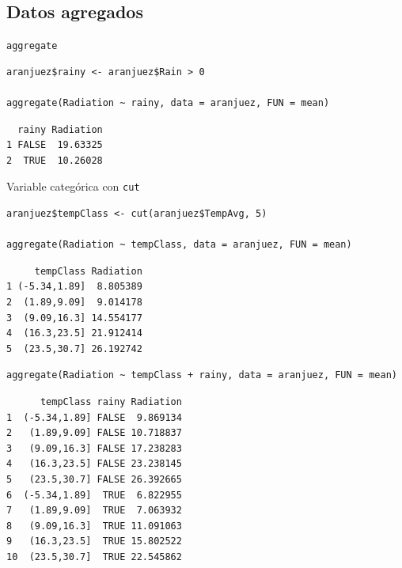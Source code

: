 \documentclass[xcolor={usenames,svgnames,dvipsnames}]{beamer}
\begin{document}
\subsection{Datos agregados}
\label{sec-5-3}
\begin{frame}[fragile,label=sec-5-3-1]{\texttt{aggregate}}
 \lstset{language=R,label= ,caption= ,numbers=none}
\begin{lstlisting}
aranjuez$rainy <- aranjuez$Rain > 0

aggregate(Radiation ~ rainy, data = aranjuez, FUN = mean)
\end{lstlisting}

\begin{verbatim}
  rainy Radiation
1 FALSE  19.63325
2  TRUE  10.26028
\end{verbatim}
\end{frame}

\begin{frame}[fragile,label=sec-5-3-2]{Variable categórica con \texttt{cut}}
 \lstset{language=R,label= ,caption= ,numbers=none}
\begin{lstlisting}
aranjuez$tempClass <- cut(aranjuez$TempAvg, 5)

aggregate(Radiation ~ tempClass, data = aranjuez, FUN = mean)
\end{lstlisting}

\begin{verbatim}
     tempClass Radiation
1 (-5.34,1.89]  8.805389
2  (1.89,9.09]  9.014178
3  (9.09,16.3] 14.554177
4  (16.3,23.5] 21.912414
5  (23.5,30.7] 26.192742
\end{verbatim}

\lstset{language=R,label= ,caption= ,numbers=none}
\begin{lstlisting}
aggregate(Radiation ~ tempClass + rainy, data = aranjuez, FUN = mean)
\end{lstlisting}

\begin{verbatim}
      tempClass rainy Radiation
1  (-5.34,1.89] FALSE  9.869134
2   (1.89,9.09] FALSE 10.718837
3   (9.09,16.3] FALSE 17.238283
4   (16.3,23.5] FALSE 23.238145
5   (23.5,30.7] FALSE 26.392665
6  (-5.34,1.89]  TRUE  6.822955
7   (1.89,9.09]  TRUE  7.063932
8   (9.09,16.3]  TRUE 11.091063
9   (16.3,23.5]  TRUE 15.802522
10  (23.5,30.7]  TRUE 22.545862
\end{verbatim}
\end{frame}
\end{document}
